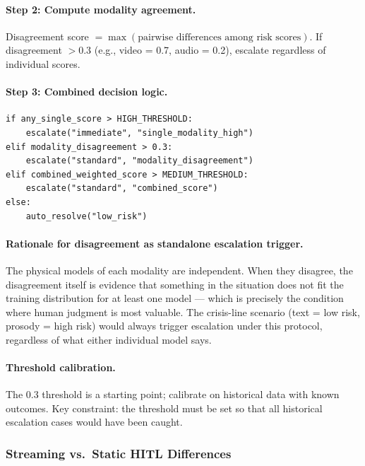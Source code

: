\paragraph{Step 2: Compute modality agreement.}

Disagreement score $= \max(\text{pairwise differences among risk scores})$. If disagreement $> 0.3$ (e.g., video = 0.7, audio = 0.2), escalate regardless of individual scores.

\paragraph{Step 3: Combined decision logic.}

\begin{lstlisting}[style=python, caption={Multimodal escalation logic}]
if any_single_score > HIGH_THRESHOLD:
    escalate("immediate", "single_modality_high")
elif modality_disagreement > 0.3:
    escalate("standard", "modality_disagreement")
elif combined_weighted_score > MEDIUM_THRESHOLD:
    escalate("standard", "combined_score")
else:
    auto_resolve("low_risk")
\end{lstlisting}

\paragraph{Rationale for disagreement as standalone escalation trigger.}

The physical models of each modality are independent. When they disagree, the disagreement itself is evidence that something in the situation does not fit the training distribution for at least one model --- which is precisely the condition where human judgment is most valuable. The crisis-line scenario (text = low risk, prosody = high risk) would always trigger escalation under this protocol, regardless of what either individual model says.

\paragraph{Threshold calibration.}

The 0.3 threshold is a starting point; calibrate on historical data with known outcomes. Key constraint: the threshold must be set so that all historical escalation cases would have been caught.

\subsubsection{Streaming vs.\ Static HITL Differences}

